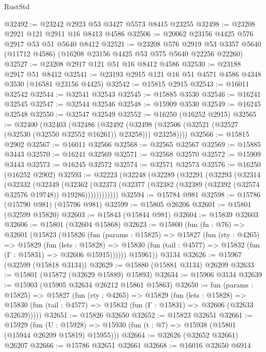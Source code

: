 \begin{lexlean}{RustStd}
\begin{coremodule}
@32492 := @23242 @2923 @53 @3427 @5573 @8415 @23255
@32498 := @23208 @2921 @121 @2911 @16 @8413 @4586
@32506 := @20062 @23156 @4425 @576 @2917 @53 @51 @5640 @8412
@32521 := @23208
    @576
    @2919
    @53
    @3357
    @5640
    (@11712 @4586)
    (@16208 @23156 @4425 @53 @575 @5640 @22256 @22260)
@32527 := @23208 @2917 @121 @51 @16 @8412 @4586
@32530 := @23188 @2917 @51 @8412
@32541 := @23193 @2915 @121 @16 @51 @4571 @4586 @4348 @3530 (@16581 @23156 @4425)
@32542 := @15815 @2915
@32543 := @16011 @32542
@32544 := @32541 @32543
@32545 := @15885 @3530
@32546 := @16241 @32545
@32547 := @32544 @32546
@32548 := @15909 @3530
@32549 := @16245 @32548
@32550 := @32547 @32549
@32552 := @16250 (@16252 @2915)
@32565 := @32400
    (@32403
      (@32486
        (@32492 (@32498 (@32506 (@32521 (@32527 (@32530 (@32550 @32552 @16261)) @23258))) @23258))))
@32566 := @15815 @2902
@32567 := @16011 @32566
@32568 := @32565 @32567
@32569 := @15885 @3443
@32570 := @16241 @32569
@32571 := @32568 @32570
@32572 := @15909 @3443
@32573 := @16245 @32572
@32574 := @32571 @32573
@32576 := @16250 (@16252 @2902)
@32593 := @32223
    (@32248
      (@32289
        (@32291
          (@32293
            (@32314
              (@32332
                (@32349
                  (@32362
                    (@32373
                      (@32377 (@32382 (@32389 (@32392 (@32574 @32576 @19748)) @19286))))))))))))
@32594 := @15784 @981
@32598 := @15786 (@15790 @981) (@15796 @981)
@32599 := @15805 @26206
@32601 := @15801 (@32599 @15820)
@32603 := @15843 (@15844 @981)
@32604 := @15839 @32603
@32606 := @15801 (@32604 @15868)
@32623 := @15800
    (fun (fn : @76) =>
    @32601
      (@15823
        (@15826
          (fun (params : @15825) =>
          @15827
            (fun (rty : @4265) =>
            @15829
              (fun (lets : @15828) =>
              @15830 (fun (tail : @4577) => @15832 (fun (Γ : @15831) => @32606 @15915))))))
        @15961))
    @3134
@32626 := @15967 (@32599 (@15818 @3134))
@32629 := @15880 (@15881 @3134) @26209
@32633 := @15801 (@15872 (@32629 @15889) @15893)
@32634 := @15906 @3134
@32639 := @15903 (@15905 @32634 @26212 @15861 @15863)
@32650 := fun (params : @15825) =>
  @15827
    (fun (rty : @4265) =>
    @15829
      (fun (lets : @15828) =>
      @15830 (fun (tail : @4577) => @15832 (fun (Γ : @15831) => @32606 (@32633 @32639)))))
@32651 := @15826 @32650
@32652 := @15823 @32651
@32661 := @15929
    (fun (U : @15928) => @15930 (fun (t : @7) => @15938 (@15801 (@15944 @26209 @15819) @15955)))
@32664 := @32626 (@32652 @32661) @26207
@32666 := @15786 @32651 @32661
@32668 := @16016 @32650 @6914

\end{coremodule}
\end{lexlean}
